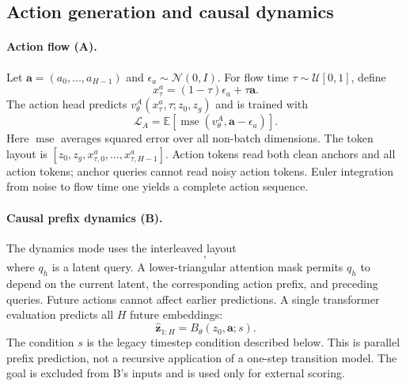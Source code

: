 \subsection{Action generation and causal dynamics}

\paragraph{Action flow (A).}
Let $\mathbf a=(a_0,\ldots,a_{H-1})$ and $\epsilon_a\sim\mathcal N(0,I)$. For flow time $\tau\sim\mathcal U[0,1]$, define
\begin{equation}
  x^a_\tau=(1-\tau)\epsilon_a+\tau\mathbf a.
\end{equation}
The action head predicts $v^A_\theta(x^a_\tau,\tau;z_0,z_g)$ and is trained with
\begin{equation}
  \mathcal L_A=
  \mathbb E\!\left[
  \operatorname{mse}\!\left(v^A_\theta,\mathbf a-\epsilon_a\right)
  \right].
  \label{eq:action_loss}
\end{equation}
Here $\operatorname{mse}$ averages squared error over all non-batch dimensions. The token layout is $[z_0,z_g,x^a_{\tau,0},\ldots,x^a_{\tau,H-1}]$. Action tokens read both clean anchors and all action tokens; anchor queries cannot read noisy action tokens. Euler integration from noise to flow time one yields a complete action sequence.

\paragraph{Causal prefix dynamics (B).}
The dynamics mode uses the interleaved layout
\begin{equation}
  [z_0,a_0,q_1,a_1,q_2,\ldots,a_{H-1},q_H],
\end{equation}
where $q_h$ is a latent query. A lower-triangular attention mask permits $q_h$ to depend on the current latent, the corresponding action prefix, and preceding queries. Future actions cannot affect earlier predictions. A single transformer evaluation predicts all $H$ future embeddings:
\begin{equation}
  \hat{\mathbf z}_{1:H}=B_\theta(z_0,\mathbf a;s).
  \label{eq:dynamics}
\end{equation}
The condition $s$ is the legacy timestep condition described below. This is parallel prefix prediction, not a recursive application of a one-step transition model.
The goal is excluded from B's inputs and is used only for external scoring.

